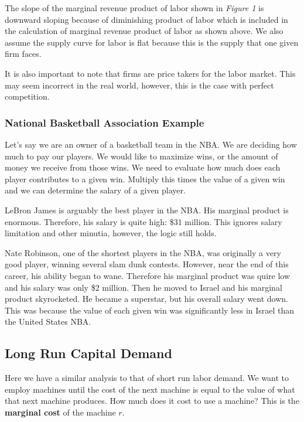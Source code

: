 \documentclass{article}
\begin{document}
The slope of the marginal revenue product of labor shown in \textit{Figure 1} is downward sloping because of diminishing product of labor which is included in the calculation of marginal revenue product of labor as shown above. We also assume the supply curve for labor is flat because this is the supply that one given firm faces.

It is also important to note that firms are price takers for the labor market. This may seem incorrect in the real world, however, this is the case with perfect competition. 

\subsubsection{National Basketball Association Example}

Let's say we are an owner of a basketball team in the NBA. We are deciding how much to pay our players. We would like to maximize wins, or the amount of money we receive from those wins. We need to evaluate how much does each player contributes to a given win. Multiply this times the value of a given win and we can determine the salary of a given player.

LeBron James is arguably the best player in the NBA. His marginal product is enormous. Therefore, his salary is quite high: \$31 million. This ignores salary limitation and other minutia, however, the logic still holds.

Nate Robinson, one of the shortest players in the NBA, was originally a very good player, winning several slam dunk contests. However, near the end of this career, his ability began to wane. Therefore his marginal product was quire low and his salary was only \$2 million. Then he moved to Israel and his marginal product skyrocketed. He became a superstar, but his overall salary went down. This was because the value of each given win was significantly less in Israel than the United States NBA.

\subsection{Long Run Capital Demand}

Here we have a similar analysis to that of short run labor demand. We want to employ machines until the cost of the next machine is equal to the value of what that next machine produces. How much does it cost to use a machine? This is the \textbf{marginal cost} of the machine $r$.
\end{document}
